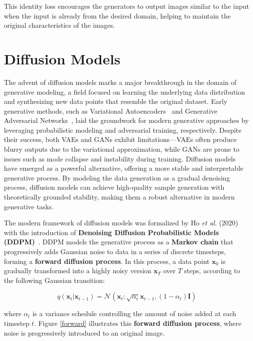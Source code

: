 \documentclass[12pt,DIV14,BCOR12mm,a4paper,footinclude=false,headinclude,parskip=half-,twoside,openright,cleardoublepage=empty,toc=index,bibliography=totoc,listof=totoc]{scrreprt}
\numberwithin{equation}{chapter}
\begin{document}
This identity loss encourages the generators to output images similar to the input when the input is already from the desired domain, helping to maintain the original characteristics of the images.
\section{Diffusion Models}
\label{sec:diffusion_model_theory}
The advent of diffusion models marks a major breakthrough in the domain of generative modeling, a field focused on learning the underlying data distribution and synthesizing new data points that resemble the original dataset. Early generative methods, such as Variational Autoencoders~\cite{VAE} and Generative Adversarial Networks~\cite{goodfellow2014generative}, laid the groundwork for modern generative approaches by leveraging probabilistic modeling and adversarial training, respectively. Despite their success, both VAEs and GANs exhibit limitations—VAEs often produce blurry outputs due to the variational approximation, while GANs are prone to issues such as mode collapse and instability during training. Diffusion models\cite{diffusion1,diffusion2} have emerged as a powerful alternative, offering a more stable and interpretable generative process. By modeling the data generation as a gradual denoising process, diffusion models can achieve high-quality sample generation with theoretically grounded stability, making them a robust alternative in modern generative tasks.

The modern framework of diffusion models was formalized by Ho \textit{et al.} (2020) with the introduction of \textbf{Denoising Diffusion Probabilistic Models (DDPM)}~\cite{diffusion2}. DDPM models the generative process as a \textbf{Markov chain} that progressively adds Gaussian noise to data in a series of discrete timesteps, forming a \textbf{forward diffusion process}. In this process, a data point \(\mathbf{x}_0\) is gradually transformed into a highly noisy version \(\mathbf{x}_T\) over \(T\) steps, according to the following Gaussian transition:

\begin{equation}
q(\mathbf{x}_t | \mathbf{x}_{t-1}) = \mathcal{N}(\mathbf{x}_t; \sqrt{\alpha_t} \mathbf{x}_{t-1}, (1 - \alpha_t)\mathbf{I})
\end{equation}

where \(\alpha_t\) is a variance schedule controlling the amount of noise added at each timestep \(t\). Figure \ref{forward} illustrates this \textbf{forward diffusion process}, where noise is progressively introduced to an original image.
\end{document}
